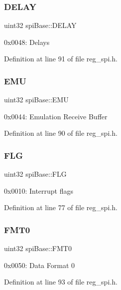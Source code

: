 \subsubsection{\texorpdfstring{D\+E\+L\+AY}{DELAY}}
{\footnotesize\ttfamily uint32 spi\+Base\+::\+D\+E\+L\+AY}

0x0048\+: Delays 

Definition at line 91 of file reg\+\_\+spi.\+h.

\mbox{\label{structspiBase_a1ac476301511d4a559437c868020d3f1}} 
\subsubsection{\texorpdfstring{E\+MU}{EMU}}
{\footnotesize\ttfamily uint32 spi\+Base\+::\+E\+MU}

0x0044\+: Emulation Receive Buffer 

Definition at line 90 of file reg\+\_\+spi.\+h.

\mbox{\label{structspiBase_a7a70455043185d39dd2420c095dd926d}} 
\subsubsection{\texorpdfstring{F\+LG}{FLG}}
{\footnotesize\ttfamily uint32 spi\+Base\+::\+F\+LG}

0x0010\+: Interrupt flags 

Definition at line 77 of file reg\+\_\+spi.\+h.

\mbox{\label{structspiBase_aad5f415f3f776b9548cc0cb36c6a39b2}} 
\subsubsection{\texorpdfstring{F\+M\+T0}{FMT0}}
{\footnotesize\ttfamily uint32 spi\+Base\+::\+F\+M\+T0}

0x0050\+: Data Format 0 

Definition at line 93 of file reg\+\_\+spi.\+h.

\mbox{\label{structspiBase_a4e38b81c53c117468cf5e52b26bdfee1}} 

